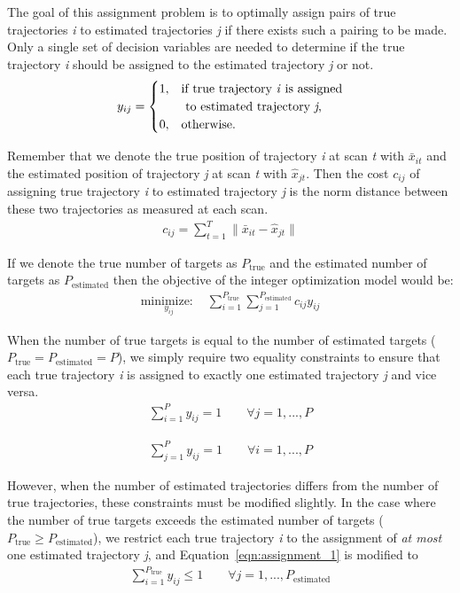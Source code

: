 \documentclass[journal]{IEEEtran}
\begin{document}
The goal of this assignment problem is to optimally assign pairs of true trajectories \textit{i} to estimated trajectories \textit{j} if there exists such a pairing to be made. Only a single set of decision variables are needed to determine if the true trajectory \textit{i} should be assigned to the estimated trajectory \textit{j} or not. 
\[y_{ij} = 
\begin{cases}
1, & \text{if true trajectory \textit{i} is assigned}\\
    & \text{ to estimated trajectory \textit{j},}\\
0, & \text{otherwise.}
\end{cases}\]

Remember that we denote the true position of trajectory \textit{i} at scan \textit{t} with $\bar{x}_{it}$ and the estimated position of trajectory \textit{j} at scan \textit{t} with $\hat{x}_{jt}$. Then the cost $c_{ij}$ of assigning true trajectory \textit{i} to estimated trajectory \textit{j} is the norm distance between these two trajectories as measured at each scan. 
\begin{align}
	c_{ij} = \sum_{t=1}^{T} \|\bar{x}_{it} - \hat{x}_{jt}\|
\end{align}

If we denote the true number of targets as $P_{\text{true}}$ and the estimated number of targets as $P_{\text{estimated}}$ then the objective of the integer optimization model would be:
\begin{align}
\underset{y_{ij}}{\text{minimize: }} & \sum_{i=1}^{P_{\text{true}}} \sum_{j=1}^{P_{\text{estimated}}} c_{ij}y_{ij}
\end{align}

When the number of true targets is equal to the number of estimated targets ($P_{\text{true}} = P_{\text{estimated}} = P$), we simply require two equality constraints to ensure that each true trajectory \textit{i} is assigned to exactly one estimated trajectory \textit{j} and vice versa. 
\begin{align}\label{eqn:assignment_1}
\sum_{i=1}^{P} y_{ij} = 1 \qquad \forall j = 1,...,P
\end{align}

\begin{align}\label{eqn:assignment_2}
\sum_{j=1}^{P} y_{ij} = 1 \qquad \forall i = 1,...,P
\end{align}

However, when the number of estimated trajectories differs from the number of true trajectories, these constraints must be modified slightly. In the case where the number of true targets exceeds the estimated number of targets ($P_{\text{true}}\geq P_{\text{estimated}}$), we restrict each true trajectory \textit{i} to the assignment of \textit{at most} one estimated trajectory \textit{j}, and Equation~\ref{eqn:assignment_1} is modified to
\begin{align}
\sum_{i=1}^{P_{\text{true}}} y_{ij} \leq 1 \qquad \forall  j = 1,...,P_{\text{estimated}}
\end{align}
\end{document}
